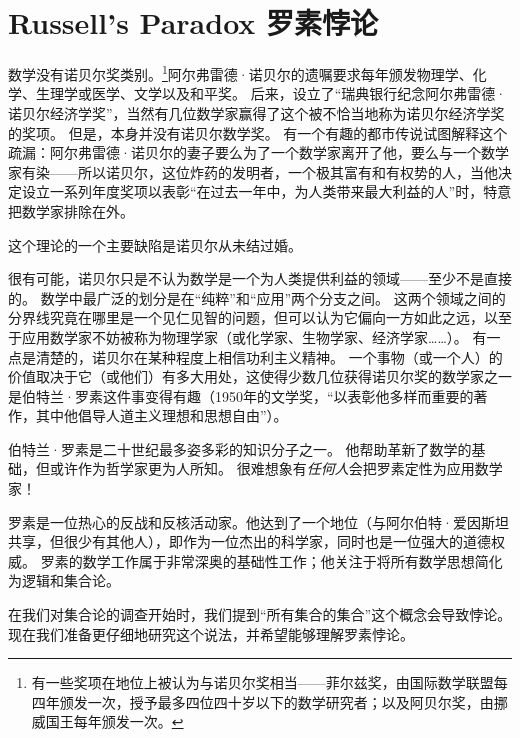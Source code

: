 
 

\clearpage 




\newpage

\section{Russell's Paradox 罗素悖论}
\label{sec:russell}

数学没有诺贝尔奖类别。\footnote{有一些奖项在地位上被认为与诺贝尔奖相当——菲尔兹奖，由国际数学联盟每四年颁发一次，授予最多四位四十岁以下的数学研究者；以及阿贝尔奖，由挪威国王每年颁发一次。}阿尔弗雷德·诺贝尔的遗嘱要求每年颁发物理学、化学、生理学或医学、文学以及和平奖。
后来，设立了“瑞典银行纪念阿尔弗雷德·诺贝尔经济学奖”，当然有几位数学家赢得了这个被不恰当地称为诺贝尔经济学奖的奖项。
但是，本身并没有诺贝尔数学奖。
有一个有趣的都市传说试图解释这个疏漏：阿尔弗雷德·诺贝尔的妻子要么为了一个数学家离开了他，要么与一个数学家有染——所以诺贝尔，这位炸药的发明者，一个极其富有和有权势的人，当他决定设立一系列年度奖项以表彰“在过去一年中，为人类带来最大利益的人”时，特意把数学家排除在外。

这个理论的一个主要缺陷是诺贝尔从未结过婚。

很有可能，诺贝尔只是不认为数学是一个为人类提供利益的领域——至少不是直接的。
数学中最广泛的划分是在“纯粹”和“应用”两个分支之间。
这两个领域之间的分界线究竟在哪里是一个见仁见智的问题，但可以认为它偏向一方如此之远，以至于应用数学家不妨被称为物理学家（或化学家、生物学家、经济学家……）。
有一点是清楚的，诺贝尔在某种程度上相信功利主义精神。
一个事物（或一个人）的价值取决于它（或他们）有多大用处，这使得少数几位获得诺贝尔奖的数学家之一是伯特兰·罗素这件事变得有趣（1950年的文学奖，“以表彰他多样而重要的著作，其中他倡导人道主义理想和思想自由”）。

伯特兰·罗素是二十世纪最多姿多彩的知识分子之一。
他帮助革新了数学的基础，但或许作为哲学家更为人所知。
很难想象有\emph{任何人}会把罗素定性为应用数学家！

罗素是一位热心的反战和反核活动家。他达到了一个地位（与阿尔伯特·爱因斯坦共享，但很少有其他人），即作为一位杰出的科学家，同时也是一位强大的道德权威。
罗素的数学工作属于非常深奥的基础性工作；他关注于将所有数学思想简化为逻辑和集合论。

在我们对集合论的调查开始时，我们提到“所有集合的集合”这个概念会导致悖论。
现在我们准备更仔细地研究这个说法，并希望能够理解罗素悖论。

